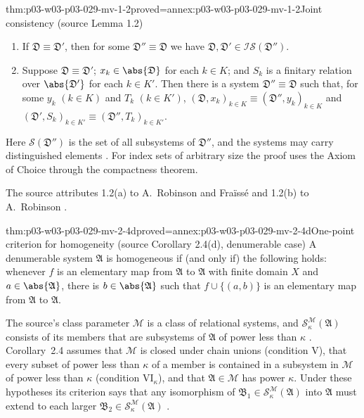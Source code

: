 \begin{hblemma}{thm:p03-w03-p03-029-mv-1-2}{proved=annex:p03-w03-p03-029-mv-1-2}{Joint consistency (source Lemma 1.2)}
\begin{enumerate}
  \item[(a)] If \(\mathfrak D\equiv\mathfrak D'\), then for some
        \(\mathfrak D''\equiv\mathfrak D\) we have \(\mathfrak D,\mathfrak
        D'\in\mathscr I\mathscr S(\mathfrak D'')\).
  \item[(b)] Suppose \(\mathfrak D\equiv\mathfrak D'\); \(x_k\in\abs{\mathfrak
        D}\) for each \(k\in K\); and \(S_k\) is a finitary relation over
        \(\abs{\mathfrak D'}\) for each \(k\in K'\). Then there is a system
        \(\mathfrak D''\equiv\mathfrak D\) such that, for some \(y_k\)
        \((k\in K)\) and \(T_k\) \((k\in K')\),
        \((\mathfrak D,x_k)_{k\in K}\equiv(\mathfrak D'',y_k)_{k\in K}\) and
        \((\mathfrak D',S_k)_{k\in K'}\equiv(\mathfrak D'',T_k)_{k\in K'}\).
\end{enumerate}
Here \(\mathscr S(\mathfrak D'')\) is the set of all subsystems of
\(\mathfrak D''\), and the systems may carry distinguished elements
\cite[p.~40, Lemma~1.2]{MorleyVaught1962}. For index sets of arbitrary size
the proof uses the Axiom of Choice through the compactness theorem.
\end{hblemma}

The source attributes 1.2(a) to A.~Robinson and Fra\"iss\'e and 1.2(b) to
A.~Robinson \cite[p.~40, footnote~3]{MorleyVaught1962}.

\begin{hblemma}{thm:p03-w03-p03-029-mv-2-4d}{proved=annex:p03-w03-p03-029-mv-2-4d}{One-point criterion for homogeneity (source Corollary 2.4(d), denumerable case)}
A denumerable system \(\mathfrak A\) is homogeneous if (and only if) the
following holds: whenever \(f\) is an elementary map from \(\mathfrak A\) to
\(\mathfrak A\) with finite domain \(X\) and \(a\in\abs{\mathfrak A}\), there
is \(b\in\abs{\mathfrak A}\) such that \(f\cup\{(a,b)\}\) is an elementary
map from \(\mathfrak A\) to \(\mathfrak A\).
\end{hblemma}

The source's class parameter \(\mathscr M\) is a class of relational
systems, and \(\mathscr S^{\mathscr M}_\kappa(\mathfrak A)\) consists of
its members that are subsystems of \(\mathfrak A\) of power less than
\(\kappa\) \cite[p.~39]{MorleyVaught1962}. Corollary~2.4 assumes that
\(\mathscr M\) is closed under chain unions (condition V), that every
subset of power less than \(\kappa\) of a member is contained in a
subsystem in \(\mathscr M\) of power less than \(\kappa\) (condition
\(\mathrm{VI}_\kappa\)), and that \(\mathfrak A\in\mathscr M\) has power
\(\kappa\). Under these hypotheses its criterion says that any
isomorphism of \(\mathfrak B_1\in
\mathscr S^{\mathscr M}_\kappa(\mathfrak A)\) into \(\mathfrak A\) must
extend to each larger
\(\mathfrak B_2\in\mathscr S^{\mathscr M}_\kappa(\mathfrak A)\)
\cite[pp.~40--43, Corollary~2.4(d)]{MorleyVaught1962}.

